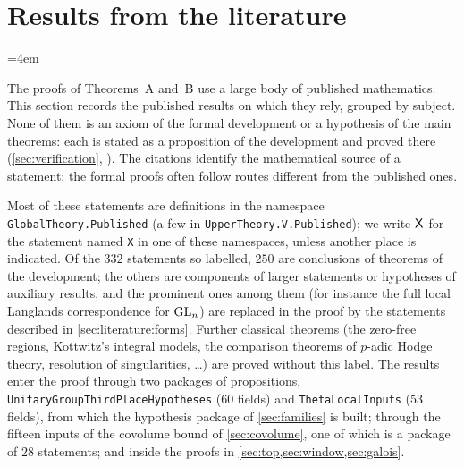 \section{Results from the literature}\label{sec:literature}
\begingroup
\emergencystretch=4em
\providecommand{\literatureformin}[1]{\textup{[}\textit{#1}\textup{]}}
\providecommand{\literatureform}[1]{\unskip\nobreak\hskip0.4em plus 0.2em\literatureformin{#1}}
\providecommand{\literaturepar}[1]{\par\medskip\noindent\textit{#1.}\enspace}
\providecommand{\literaturegroup}[1]{\multicolumn{4}{@{}l}{\textit{#1}}\\[1pt]}

The proofs of Theorems~A and~B use a large body of published mathematics.  This section records
the published results on which they rely, grouped by subject.  None of them is an axiom of the
formal development or a hypothesis of the main theorems: each is stated as a proposition of the
development \cite{LeanSource2026} and proved there (\cref{sec:verification}, \cite{Sutherland2026}).
The citations identify the mathematical source of a statement; the formal proofs often follow
routes different from the published ones.

Most of these statements are definitions in the namespace \texttt{GlobalTheory.Published} (a few
in \texttt{UpperTheory.V.Published}); we write $\mathsf{X}$ for the statement named \texttt{X} in
one of these namespaces, unless another place is indicated.  Of the $332$ statements so labelled, $250$
are conclusions of theorems of the development; the others are components of larger statements or
hypotheses of auxiliary results, and the prominent ones among them (for instance the full local
Langlands correspondence for $\operatorname{GL}_n$) are replaced in the proof by the statements described in
\cref{sec:literature:forms}.  Further classical theorems (the zero-free regions, Kottwitz's integral
models, the comparison theorems of $p$-adic Hodge theory, resolution of singularities, \dots) are
proved without this label.  The results enter the proof through two packages of propositions,
\texttt{UnitaryGroupThirdPlaceHypotheses} ($60$ fields) and \texttt{ThetaLocalInputs} ($53$
fields), from which the hypothesis package of \cref{sec:families} is built; through the fifteen
inputs of the covolume bound of \cref{sec:covolume}, one of which is a package of $28$ statements;
and inside the proofs in \cref{sec:top,sec:window,sec:galois}.

